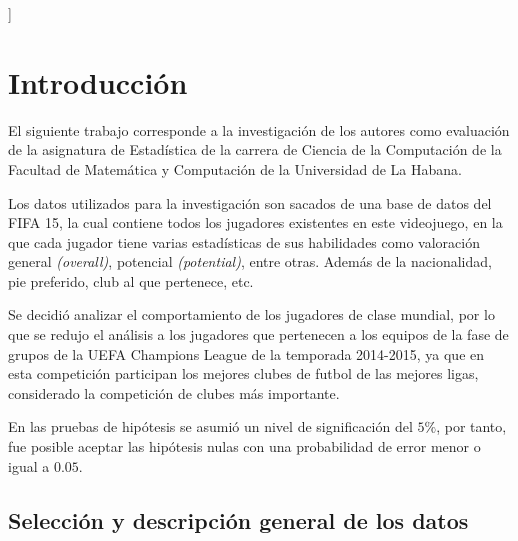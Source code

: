 \documentclass[a4paper,10pt,twocolumn]{article}
\begin{document}
\vspace{0.8cm}
]



\section{Introducción}\label{sec:intro}

El siguiente trabajo corresponde a la investigación de los autores como evaluación de la asignatura de Estadística de la carrera de Ciencia de la Computación de la Facultad de Matemática y Computación de la Universidad de La Habana.

Los datos utilizados para la investigación son sacados de una base de datos del FIFA 15, la cual contiene todos los jugadores existentes en este videojuego, en la que cada jugador tiene varias estadísticas de sus habilidades como valoración general \textit{(overall)}, potencial \textit{(potential)}, entre otras. Además de la nacionalidad, pie preferido, club al que pertenece, etc.

Se decidió analizar el comportamiento de los jugadores de clase mundial, por lo que se redujo el análisis a los jugadores que pertenecen a los equipos de la fase de grupos de la UEFA Champions League de la temporada 2014-2015, ya que en esta competición participan los mejores clubes de futbol de las mejores ligas, considerado la competición de clubes más importante.

En las pruebas de hipótesis se asumió un nivel de significación del $5\%$, por tanto, fue posible aceptar las hipótesis nulas con una probabilidad de error menor o igual a $0.05$.

\subsection{Selección y descripción general de los datos}\label{sec:sel_desc}
\end{document}
